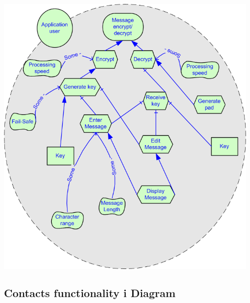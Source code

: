 \begin{center}
 \includegraphics[width=13cm]{diagrams/IStarDiagrams/messagingIstar.png}
\end{center}

\subsection*{Contacts functionality i\text{*} Diagram}

